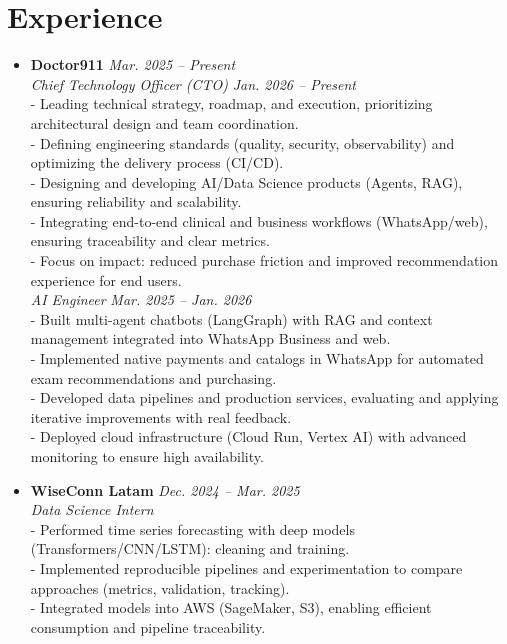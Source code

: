 \documentclass[a4paper,10pt]{article}
\begin{document}
\section*{Experience}
\begin{itemize}[left=0pt,noitemsep,nolistsep]

    \item \textbf{Doctor911} \hfill \textit{Mar. 2025 -- Present} \\
    \textit{Chief Technology Officer (CTO)} \hfill \textit{Jan. 2026 -- Present} \\
    - Leading technical strategy, roadmap, and execution, prioritizing architectural design and team coordination. \\
    - Defining engineering standards (quality, security, observability) and optimizing the delivery process (CI/CD). \\
    - Designing and developing AI/Data Science products (Agents, RAG), ensuring reliability and scalability. \\
    - Integrating end-to-end clinical and business workflows (WhatsApp/web), ensuring traceability and clear metrics. \\
    - Focus on impact: reduced purchase friction and improved recommendation experience for end users. \\

    \textit{AI Engineer} \hfill \textit{Mar. 2025 -- Jan. 2026} \\
    - Built multi-agent chatbots (LangGraph) with RAG and context management integrated into WhatsApp Business and web. \\
    - Implemented native payments and catalogs in WhatsApp for automated exam recommendations and purchasing. \\
    - Developed data pipelines and production services, evaluating and applying iterative improvements with real feedback. \\
    - Deployed cloud infrastructure (Cloud Run, Vertex AI) with advanced monitoring to ensure high availability. \\

    \item \textbf{WiseConn Latam} \hfill \textit{Dec. 2024 -- Mar. 2025} \\
    \textit{Data Science Intern} \\
    - Performed time series forecasting with deep models (Transformers/CNN/LSTM): cleaning and training. \\
    - Implemented reproducible pipelines and experimentation to compare approaches (metrics, validation, tracking). \\
    - Integrated models into AWS (SageMaker, S3), enabling efficient consumption and pipeline traceability. \\


\end{itemize}
\end{document}
